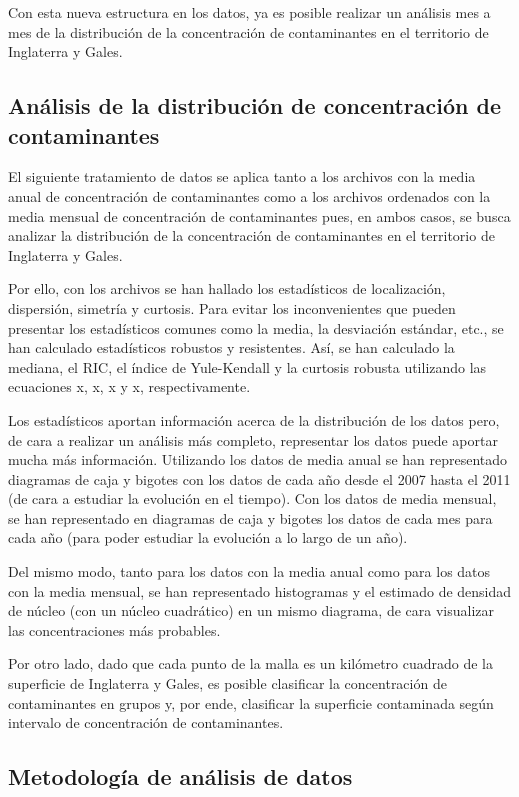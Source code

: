 \documentclass[12pt]{article}
\begin{document}
Con esta nueva estructura en los datos, ya es posible realizar un análisis mes a mes de la distribución de la concentración de contaminantes en el territorio de Inglaterra y Gales.

\subsection{Análisis de la distribución de concentración de contaminantes}

El siguiente tratamiento de datos se aplica tanto a los archivos con la media anual de concentración de contaminantes como a los archivos ordenados con la media mensual de concentración de contaminantes pues, en ambos casos, se busca analizar la distribución de la concentración de contaminantes en el territorio de Inglaterra y Gales.

Por ello, con los archivos se han hallado los estadísticos de localización, dispersión, simetría y curtosis. Para evitar los inconvenientes que pueden presentar los estadísticos comunes como la media, la desviación estándar, etc., se han calculado estadísticos robustos y resistentes. Así, se han calculado la mediana, el RIC, el índice de Yule-Kendall y la curtosis robusta utilizando las ecuaciones x, x, x y x, respectivamente.

Los estadísticos aportan información acerca de la distribución de los datos pero, de cara a realizar un análisis más completo, representar los datos puede aportar mucha más información. Utilizando los datos de media anual se han representado diagramas de caja y bigotes con los datos de cada año desde el 2007 hasta el 2011 (de cara a estudiar la evolución en el tiempo). Con los datos de media mensual, se han representado en diagramas de caja y bigotes los datos de cada mes para cada año (para poder estudiar la evolución a lo largo de un año).

Del mismo modo, tanto para los datos con la media anual como para los datos con la media mensual, se han representado histogramas y el estimado de densidad de núcleo (con un núcleo cuadrático) en un mismo diagrama, de cara visualizar las concentraciones más probables.

Por otro lado, dado que cada punto de la malla es un kilómetro cuadrado de la superficie de Inglaterra y Gales, es posible clasificar la concentración de contaminantes en grupos y, por ende, clasificar la superficie contaminada según intervalo de concentración de contaminantes.

\subsection{Metodología de análisis de datos}
\end{document}
